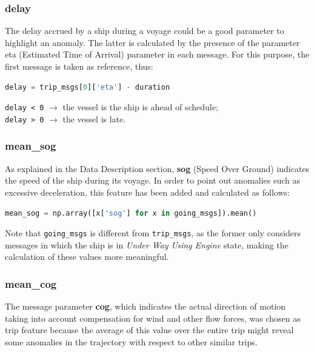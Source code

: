     \subsubsection{delay}
    
        The delay accrued by a ship during a voyage could be a good parameter to highlight an anomaly. The latter is calculated by the presence of the parameter eta (Estimated Time of Arrival) parameter in each message. For this purpose, the first message is taken as reference, thus:
        
        \begin{lstlisting}[language=Python, frame=none]
delay = trip_msgs[0]['eta'] - duration
        \end{lstlisting} 
        
        \verb|delay < 0| $\rightarrow$ the vessel is the ship is ahead of schedule;
        \\
        \verb|delay > 0| $\rightarrow$ the vessel is late.
        
    \subsubsection{mean\_sog}
    
    As explained in the Data Description section, \textbf{sog} (Speed Over Ground) indicates the speed of the ship during its voyage. In order to point out anomalies such as excessive deceleration, this feature has been added and calculated as follows:
    
    \begin{lstlisting}[language=Python, frame=none]
mean_sog = np.array([x['sog'] for x in going_msgs]).mean()
    \end{lstlisting} 
    
    Note that \verb|going_msgs| is different from \verb|trip_msgs|, as the former only considers messages in which the ship is in \textit{Under Way Using Engine} state, making the calculation of these values more meaningful.
            
    \subsubsection{mean\_cog}
    
    The message parameter \textbf{cog}, which indicates the actual direction of motion taking into account compensation for wind and other flow forces, was chosen as trip feature because the average of this value over the entire trip might reveal some anomalies in the trajectory with respect to other similar trips.
    
